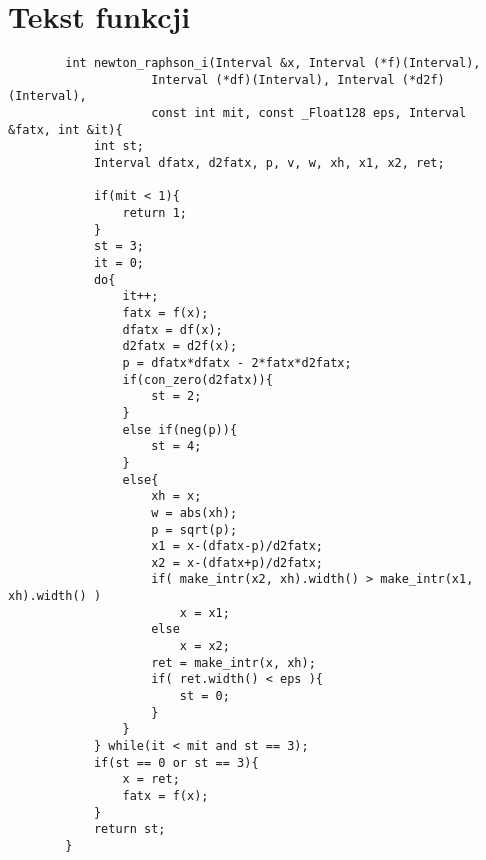 \documentclass[11pt]{article}
\begin{document}
\section{Tekst funkcji}
    \begin{verbatim}
        int newton_raphson_i(Interval &x, Interval (*f)(Interval), 
                    Interval (*df)(Interval), Interval (*d2f)(Interval),
                    const int mit, const _Float128 eps, Interval &fatx, int &it){
            int st;
            Interval dfatx, d2fatx, p, v, w, xh, x1, x2, ret;
        
            if(mit < 1){
                return 1;
            }
            st = 3;
            it = 0;
            do{
                it++;
                fatx = f(x);
                dfatx = df(x);
                d2fatx = d2f(x);
                p = dfatx*dfatx - 2*fatx*d2fatx;
                if(con_zero(d2fatx)){
                    st = 2;
                }
                else if(neg(p)){
                    st = 4;
                }
                else{
                    xh = x;
                    w = abs(xh);
                    p = sqrt(p);
                    x1 = x-(dfatx-p)/d2fatx;
                    x2 = x-(dfatx+p)/d2fatx;
                    if( make_intr(x2, xh).width() > make_intr(x1, xh).width() )
                        x = x1;
                    else 
                        x = x2;
                    ret = make_intr(x, xh);
                    if( ret.width() < eps ){
                        st = 0;
                    }
                }
            } while(it < mit and st == 3);
            if(st == 0 or st == 3){
                x = ret;
                fatx = f(x);
            }
            return st;
        } 
    \end{verbatim}

\pagebreak
\end{document}
